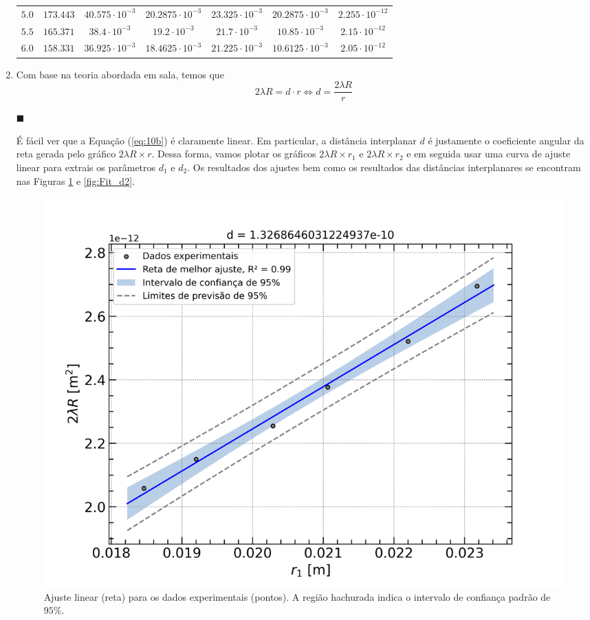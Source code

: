 \documentclass[12pt,a4paper]{article}
\begin{document}
\begin{enumerate}
\begin{table}[htp!]
\begin{tabular}{|c|c|c|c|c|c|c|}
                $5.0$ & $173.443$ & $40.575\cdot10^{-3}$ & $20.2875\cdot10^{-3}$ & $23.325\cdot10^{-3}$ & $20.2875\cdot10^{-3}$ & $2.255\cdot10^{-12}$ \\

                $5.5$ & $165.371$ & $38.4\cdot10^{-3}$ & $19.2\cdot10^{-3}$ & $21.7\cdot10^{-3}$ & $10.85\cdot10^{-3}$ & $2.15\cdot10^{-12}$ \\

                $6.0$ & $158.331$ & $36.925\cdot10^{-3}$ & $18.4625\cdot10^{-3}$ & $21.225\cdot10^{-3}$ & $10.6125\cdot10^{-3}$ & $2.05\cdot10^{-12}$ \\
                \hline
            \end{tabular}
            \label{tab:Atv10a}
        \end{table}


        \item Com base na teoria abordada em sala, temos que
        \begin{equation} \label{eq:10b}
            2\lambda R=d\cdot r\iff d=\frac{2\lambda R}{r}
        \end{equation}
        \begin{flushright}
            $\blacksquare$
        \end{flushright}

        É fácil ver que a Equação (\ref{eq:10b}) é claramente linear. Em particular, a distância interplanar $d$ é justamente o coeficiente angular da reta gerada pelo gráfico $2\lambda R\times r$. Dessa forma, vamos plotar os gráficos $2\lambda R\times r_1$ e $2\lambda R\times r_2$ e em seguida usar uma curva de ajuste linear para extrais os parâmetros $d_1$ e $d_2$. Os resultados dos ajustes bem como os resultados das distâncias interplanares se encontram nas Figuras \ref{fig:Fit_d1} e \ref{fig:Fit_d2}.

        \begin{figure}[htp!]
            \centering
            \includegraphics[width=1.00\linewidth]{Figures/Fit_d1.png}
            \caption{Ajuste linear (reta) para os dados experimentais (pontos). A região hachurada indica o intervalo de confiança padrão de $95\%$.}
            \label{fig:Fit_d1}
        \end{figure}


\end{enumerate}
\end{document}
